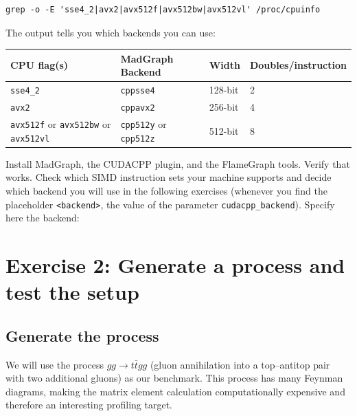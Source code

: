 \documentclass[11pt,a4paper]{article}
\begin{document}
\begin{lstlisting}[style=bashstyle]
grep -o -E 'sse4_2|avx2|avx512f|avx512bw|avx512vl' /proc/cpuinfo
\end{lstlisting}

The output tells you which backends you can use:
\begin{center}
\begin{tabular}{llll}
\toprule
\textbf{CPU flag(s)} & \textbf{MadGraph Backend} & \textbf{Width} & \textbf{Doubles/instruction} \\
\midrule
\texttt{sse4\_2}  & \texttt{cppsse4} & 128-bit & 2 \\
\texttt{avx2}     & \texttt{cppavx2} & 256-bit & 4 \\
\texttt{avx512f} or \texttt{avx512bw} or \texttt{avx512vl} & \texttt{cpp512y} or \texttt{cpp512z} & 512-bit & 8 \\
\bottomrule
\end{tabular}
\end{center}

\begin{exercisebox}[Exercise 1]
Install MadGraph, the CUDACPP plugin, and the FlameGraph tools.
Verify that \perf works.
Check which SIMD instruction sets your machine supports and decide which backend you will use in the following exercises (whenever you find the placeholder \texttt{<backend>}, the value of the parameter \texttt{cudacpp\_backend}).
Specify here the backend: \TextField[name=backend, width=2.5cm]{}
\end{exercisebox}

\section{Exercise 2: Generate a process and test the setup}
\label{sec:generate}

\subsection{Generate the process}

We will use the process $gg \to t\bar{t}gg$ (gluon annihilation into a top--antitop pair with two additional gluons) as our benchmark.
This process has many Feynman diagrams, making the matrix element calculation computationally expensive and therefore an interesting profiling target.
\end{document}
